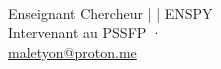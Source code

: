 \begin{titlepage}
\vspace{0.6cm}

\begin{center}
    {\large\bfseries\color{CouleurPrimaire}
        \auteurcours}\\[0.5ex]
    {\normalsize\color{CouleurSecondaire}
       Enseignant Chercheur | \laboratoire{} | ENSPY}\\[0.2ex]
    {\small\color{CouleurBordInfo}
        Intervenant au PSSFP · \tutelle}\\[0.2ex]
    {\small\color{CouleurBordInfo}
        \href{mailto:maletyon@proton.me}{maletyon@proton.me}}
\end{center}

\end{titlepage}
